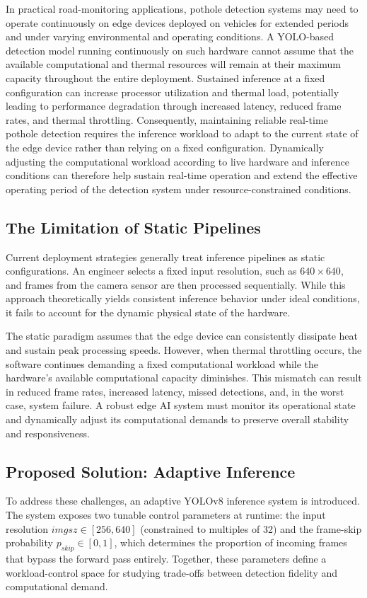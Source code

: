 \documentclass{ieeeaccess}
\begin{document}
In practical road-monitoring applications, pothole detection systems may need to operate continuously on edge devices deployed on vehicles for extended periods and under varying environmental and operating conditions. A YOLO-based detection model running continuously on such hardware cannot assume that the available computational and thermal resources will remain at their maximum capacity throughout the entire deployment. Sustained inference at a fixed configuration can increase processor utilization and thermal load, potentially leading to performance degradation through increased latency, reduced frame rates, and thermal throttling. Consequently, maintaining reliable real-time pothole detection requires the inference workload to adapt to the current state of the edge device rather than relying on a fixed configuration. Dynamically adjusting the computational workload according to live hardware and inference conditions can therefore help sustain real-time operation and extend the effective operating period of the detection system under resource-constrained conditions.

\subsection{The Limitation of Static Pipelines}
Current deployment strategies generally treat inference pipelines as static configurations. An engineer selects a fixed input resolution, such as $640 \times 640$, and frames from the camera sensor are then processed sequentially. While this approach theoretically yields consistent inference behavior under ideal conditions, it fails to account for the dynamic physical state of the hardware.

The static paradigm assumes that the edge device can consistently dissipate heat and sustain peak processing speeds. However, when thermal throttling occurs, the software continues demanding a fixed computational workload while the hardware's available computational capacity diminishes. This mismatch can result in reduced frame rates, increased latency, missed detections, and, in the worst case, system failure. A robust edge AI system must monitor its operational state and dynamically adjust its computational demands to preserve overall stability and responsiveness.

\subsection{Proposed Solution: Adaptive Inference}
\begin{highlight}
To address these challenges, an adaptive YOLOv8 inference system is introduced. The system exposes two tunable control parameters at runtime: the input resolution $imgsz \in [256, 640]$ (constrained to multiples of 32) and the frame-skip probability $p_{skip} \in [0, 1]$, which determines the proportion of incoming frames that bypass the forward pass entirely. Together, these parameters define a workload-control space for studying trade-offs between detection fidelity and computational demand.
\end{highlight}
\end{document}
